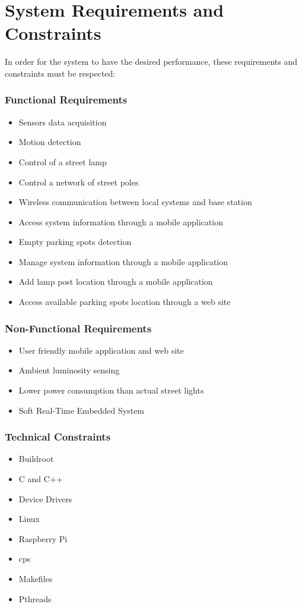 \section{System Requirements and Constraints}
\label{subsection:requirements_constraints}
In order for the system to have the desired performance, these requirements and constraints must be respected:
\subsubsection{Functional Requirements}
\begin{itemize}
        \item Sensors data acquisition                          
        \item Motion detection
        \item Control of a street lamp
		\item Control a network of street poles
        \item Wireless communication between local systems and base station
		\item Access system information through a mobile application
        \item Empty parking spots detection
        \item Manage system information through a mobile application
        \item Add lamp post location through a mobile application
        \item Access available parking spots location through a web site
\end{itemize}

\subsubsection{Non-Functional Requirements}
\begin{itemize}
        \item User friendly mobile application and web site
        \item Ambient luminosity sensing
        \item Lower power consumption than actual street lights
        \item Soft Real-Time Embedded System
\end{itemize}

\subsubsection{Technical Constraints}
\begin{itemize}
        \item Buildroot
        \item C and C++ 
        \item Device Drivers
        \item Linux
        \item Raspberry Pi
        \item \ac{cps}
        \item Makefiles
        \item Pthreads
\end{itemize}

